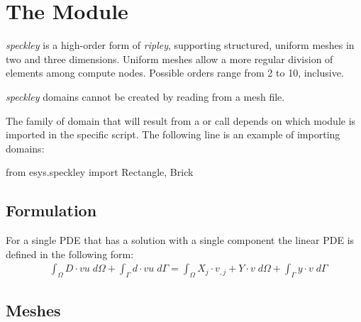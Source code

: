 
%
%
%

\chapter{The \speckley Module}\label{chap:speckley}

{\it speckley} is a high-order form of {\it ripley}, supporting structured, 
uniform meshes in two and three dimensions. Uniform meshes allow a more regular 
division of elements among compute nodes. Possible orders range from 2 to 10,
inclusive.

{\it speckley} domains cannot be created by reading from a mesh file.

The family of domain that will result from a 
 or  call depends on which module is imported in
the specific script. The following line is an example of importing 
\speckley domains:

\begin{python}
 from esys.speckley import Rectangle, Brick
\end{python}

\section{Formulation}
For a single PDE that has a solution with a single component the linear PDE is
defined in the following form:
\begin{equation}\label{SPECKLEY.SINGLE.1}
\begin{array}{cl} &
\displaystyle{
\int_{\Omega}
D \cdot vu \; d\Omega + \int_{\Gamma} d \cdot vu \; d{\Gamma} }
= \displaystyle{\int_{\Omega}  X_{j} \cdot v_{,j}+ Y \cdot v \; d\Omega }
+ \displaystyle{\int_{\Gamma} y \cdot v \; d{\Gamma}}
\end{array}
\end{equation}

\section{Meshes}
\label{SPECKLEY MESHES}


